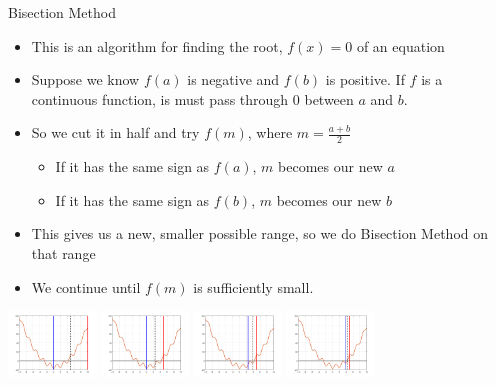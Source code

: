{}\documentclass[letterpaper,
compress,
xcolor=x11names,
]{beamer}
\begin{document}
\begin{frame}{Bisection Method}
	\footnotesize
	\begin{itemize}
		\item This is an algorithm for finding the root, $f(x) = 0$ of an equation
		\item Suppose we know $f(a)$ is negative and $f(b)$ is positive. If $f$ is a continuous function, is must pass through 0 between $a$ and $b$.
		\item So we cut it in half and try $f(m)$, where $m  =\frac{a+b}{2}$
		\begin{itemize}
			\item If it has the same sign as $f(a)$, $m$ becomes our new $a$
			\item If it has the same sign as $f(b)$, $m$ becomes our new $b$
		\end{itemize} 
		\item This gives us a new, smaller possible range, so we do Bisection Method on that range
		\item We continue until $f(m)$ is sufficiently small.
	\end{itemize}
	\begin{center}
		\includegraphics[height = 1.75cm]{bisection_img1.png}
		\includegraphics[height = 1.75cm]{bisection_img2.png}
		\includegraphics[height = 1.75cm]{bisection_img3.png}
		\includegraphics[height = 1.75cm]{bisection_img4.png}
	\end{center}
\end{frame}

\end{document}
